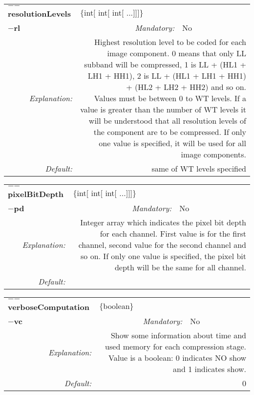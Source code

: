 \begin{center}\begin{tabular}{|rr|rlrl|}
\hline
\multicolumn{2}{|l|}{\textbf{$-$$-$resolutionLevels}} & \multicolumn{4}{|l|}{$\{$int$[$ int$[$ int$[$ ...$]$$]$$]$$\}$} \\
\cline{3-6}
\multicolumn{2}{|l|}{\textbf{$-$rl}} & \emph{Mandatory:} & No & &  \\
\hline
\emph{Explanation:} & \multicolumn{5}{|p{12cm}|}{Highest resolution level to be coded for each image component. 0 means that only LL subband will be compressed, 1 is LL + (HL1 + LH1 + HH1), 2 is LL + (HL1 + LH1 + HH1) + (HL2 + LH2 + HH2) and so on. \newline Values must be between 0 to WT levels. If a value is greater than the number of WT levels it will be understood that all resolution levels of the component are to be compressed. If only one value is specified, it will be used for all image components.} \\
\hline
\emph{Default:} & \multicolumn{5}{|p{12cm}|}{same of WT levels specified} \\
\hline
\end{tabular}\end{center}
\begin{center}\begin{tabular}{|rr|rlrl|}
\hline
\multicolumn{2}{|l|}{\textbf{$-$$-$pixelBitDepth}} & \multicolumn{4}{|l|}{$\{$int$[$ int$[$ int$[$ ...$]$$]$$]$$\}$} \\
\cline{3-6}
\multicolumn{2}{|l|}{\textbf{$-$pd}} & \emph{Mandatory:} & No & &  \\
\hline
\emph{Explanation:} & \multicolumn{5}{|p{12cm}|}{Integer array which indicates the pixel bit depth for each channel. First value is for the first channel, second value for the second channel and so on. If only one value is specified, the pixel bit depth will be the same for all channel.} \\
\hline
\emph{Default:} & \multicolumn{5}{|p{12cm}|}{ } \\
\hline
\end{tabular}\end{center}
\begin{center}\begin{tabular}{|rr|rlrl|}
\hline
\multicolumn{2}{|l|}{\textbf{$-$$-$verboseComputation}} & \multicolumn{4}{|l|}{$\{$boolean$\}$} \\
\cline{3-6}
\multicolumn{2}{|l|}{\textbf{$-$vc}} & \emph{Mandatory:} & No & &  \\
\hline
\emph{Explanation:} & \multicolumn{5}{|p{12cm}|}{Show some information about time and used memory for each compression stage. Value is a boolean: 0 indicates NO show and 1 indicates show.} \\
\hline
\emph{Default:} & \multicolumn{5}{|p{12cm}|}{0 } \\
\hline
\end{tabular}\end{center}
